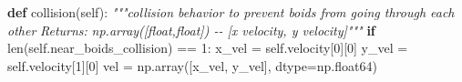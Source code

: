 \documentclass[
]{article}
\newenvironment{Shaded}{}{}
\newcommand{\BuiltInTok}[1]{#1}
\newcommand{\CommentTok}[1]{\textcolor[rgb]{0.38,0.63,0.69}{\textit{#1}}}
\newcommand{\ControlFlowTok}[1]{\textcolor[rgb]{0.00,0.44,0.13}{\textbf{#1}}}
\newcommand{\DecValTok}[1]{\textcolor[rgb]{0.25,0.63,0.44}{#1}}
\newcommand{\KeywordTok}[1]{\textcolor[rgb]{0.00,0.44,0.13}{\textbf{#1}}}
\newcommand{\NormalTok}[1]{#1}
\newcommand{\OperatorTok}[1]{\textcolor[rgb]{0.40,0.40,0.40}{#1}}
\newcommand{\VariableTok}[1]{\textcolor[rgb]{0.10,0.09,0.49}{#1}}
\begin{document}
\begin{Shaded}
\begin{Highlighting}[]
    \KeywordTok{def}\NormalTok{ collision(}\VariableTok{self}\NormalTok{):}
        \CommentTok{"""collision behavior to prevent boids from going through each other}
\CommentTok{        Returns:}
\CommentTok{            np.array([float,float]) {-}{-} [x velocity, y velocity]"""}
        \ControlFlowTok{if} \BuiltInTok{len}\NormalTok{(}\VariableTok{self}\NormalTok{.near\_boids\_collision) }\OperatorTok{==} \DecValTok{1}\NormalTok{:}
\NormalTok{            x\_vel }\OperatorTok{=} \VariableTok{self}\NormalTok{.velocity[}\DecValTok{0}\NormalTok{][}\DecValTok{0}\NormalTok{]}
\NormalTok{            y\_vel }\OperatorTok{=} \VariableTok{self}\NormalTok{.velocity[}\DecValTok{1}\NormalTok{][}\DecValTok{0}\NormalTok{]}
\NormalTok{            vel }\OperatorTok{=}\NormalTok{ np.array([x\_vel, y\_vel], dtype}\OperatorTok{=}\NormalTok{np.float64)}


\end{Highlighting}
\end{Shaded}
\end{document}
